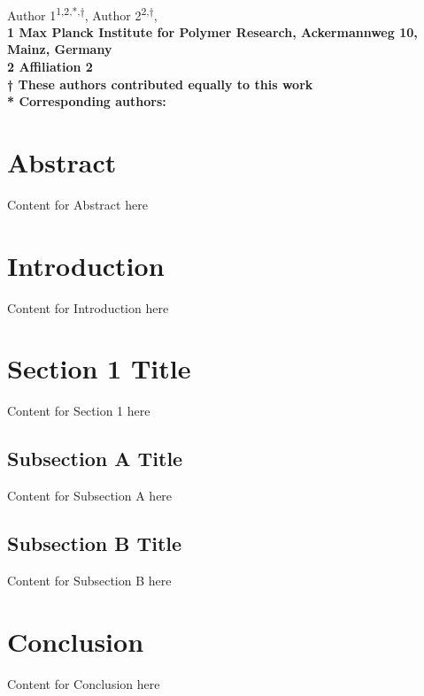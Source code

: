 \documentclass[10pt,letterpaper]{article}
\begin{document}
\vspace*{0.35in}

\begin{flushleft}
{\Large
\textbf{}
}
\newline
\\
Author 1\textsuperscript{1,2,*,†},
Author 2\textsuperscript{2,†},
\\
\bigskip
\bf{1} Max Planck Institute for Polymer Research, Ackermannweg 10, Mainz, Germany
\\
\bf{2} Affiliation 2
\\
\bigskip
† These authors contributed equally to this work
\\
* Corresponding authors: 

\end{flushleft}

\justifying

\section*{Abstract}\label{abstract}
Content for Abstract here

\section*{Introduction}\label{intro}
Content for Introduction here

\section*{Section 1 Title}\label{section1}
Content for Section 1 here \cite{smith2020example}

\subsection*{Subsection A Title}\label{subsecA}
Content for Subsection A here

\subsection*{Subsection B Title}\label{subsecB}
Content for Subsection B here

\section*{Conclusion}
Content for Conclusion here
\end{document}
